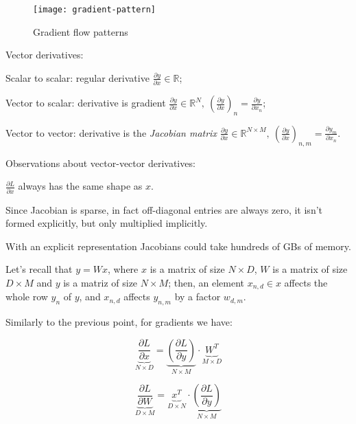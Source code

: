 \begin{figure}[!h]
    \centering
    \texttt{[image: gradient-pattern]}
    \caption[Gradient flow patterns]{Gradient flow patterns}
    \label{fig:gradient-pattern}
\end{figure}

Vector derivatives:
\begin{myitem}
    \item Scalar to scalar: regular derivative
    $\frac{\partial y}{\partial x} \in \mathbb{R}$;
    \item Vector to scalar: derivative is gradient
    $\frac{\partial y}{\partial x} \in \mathbb{R}^N, \ \left(\frac{\partial y}{\partial x}\right)_n = \frac{\partial y}{\partial x_n}$;
    \item Vector to vector: derivative is the \textit{Jacobian matrix}
    $\frac{\partial y}{\partial x} \in \mathbb{R}^{N \times M}, \ \left(\frac{\partial y}{\partial x}\right)_{n,m} = \frac{\partial y_m}{\partial x_n}$.
\end{myitem}

\begin{obs}
    Observations about vector-vector derivatives:
    \begin{myitem}
        \item $\frac{\partial L}{\partial x}$ always has the same shape as $x$.
        \item Since Jacobian is sparse, in fact off-diagonal entries are always zero, it isn't formed explicitly, but only multiplied implicitly.
        \item With an explicit representation Jacobians could take hundreds of GBs of memory.
        \item Let's recall that $y = Wx$, where $x$ is a matrix of size $N \times D$, $W$ is a matrix of size $D \times M$ and $y$ is a matriz of size $N \times M$; then, an element $x_{n,d} \in x$ affects the whole row $y_n$ of $y$, and $x_{n,d}$ affects $y_{n,m}$ by a factor $w_{d,m}$.
        \item Similarly to the previous point, for gradients we have:\\
        \begin{minipage}{.45\linewidth}
            \begin{equation}
                \underbrace{\frac{\partial L}{\partial x}}_{N \times D} = 
                \underbrace{\left(\frac{\partial L}{\partial y}\right)}_{N \times M} \cdot 
                \underbrace{W^T}_{M \times D}
            \end{equation}
        \end{minipage}
        \begin{minipage}{.45\linewidth}
            \begin{equation}
                \underbrace{\frac{\partial L}{\partial W}}_{D \times M} =
                \underbrace{x^T}_{D \times N} \cdot
                \underbrace{\left(\frac{\partial L}{\partial y}\right)}_{N \times M}
            \end{equation}
        \end{minipage}
    \end{myitem}
\end{obs}

